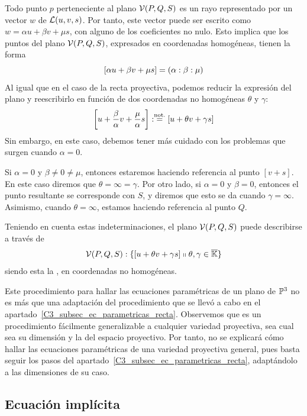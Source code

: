 Todo punto $p$ perteneciente al plano $\mathcal{V}(P,Q,S)$ es un rayo representado por un vector $w$ de $\mathcal{L}(u,v,s)$. Por tanto, este vector puede ser escrito como $w=\alpha u +\beta v+\mu s$, con alguno de los coeficientes no nulo. Esto implica que los puntos del plano $\mathcal{V}(P,Q,S)$, expresados en coordenadas homogéneas, tienen la forma
\[\left [ \alpha u+\beta v+\mu s \right ]=(\alpha:\beta:\mu)\]
Al igual que en el caso de la recta proyectiva, podemos reducir la expresión del plano y reescribirlo en función de dos coordenadas no homogéneas $\theta$ y $\gamma$:
\[\left [ u+\frac{\beta}{\alpha}v+\frac{\mu}{\alpha}s \right ]:\stackrel{\textrm{not.}}{=}\left [ u+\theta v+\gamma s \right ]\]
Sin embargo, en este caso, debemos tener más cuidado con los problemas que surgen cuando $\alpha=0$.

Si $\alpha=0$ y $\beta\not=0\not=\mu$, entonces estaremos haciendo referencia al punto $[v+s]$. En este caso diremos que $\theta=\infty=\gamma$. Por otro lado, si $\alpha=0$ y $\beta=0$, entonces el punto resultante se corresponde con $S$, y diremos que esto se da cuando $\gamma=\infty$. Asimismo, cuando $\theta=\infty$, estamos haciendo referencia al punto $Q$.

Teniendo en cuenta estas indeterminaciones, el plano $\mathcal{V}(P,Q,S)$ puede describirse a través de
\begin{equation}
\label{C3_eq_descripcionPlanoP1}
\mathcal{V}(P,Q,S):\{\left [ u+\theta v+\gamma s \right ]\shortparallel \theta,\gamma\in\overline{\mathbb{K}}\}
\end{equation}
siendo esta la , en coordenadas no homogéneas.

\begin{obs}
	Este procedimiento para hallar las ecuaciones paramétricas de un plano de $\mathbb{P}^3$ no es más que una adaptación del procedimiento que se llevó a cabo en el apartado~\ref{C3_subsec_ec_parametricas_recta}. Observemos que es un procedimiento fácilmente generalizable a cualquier variedad proyectiva, sea cual sea su dimensión y la del espacio proyectivo. Por tanto, no se explicará cómo hallar las ecuaciones paramétricas de una variedad proyectiva general, pues basta seguir los pasos del apartado~\ref{C3_subsec_ec_parametricas_recta}, adaptándolo a las dimensiones de su caso.
\end{obs}

\subsection{Ecuación implícita}

